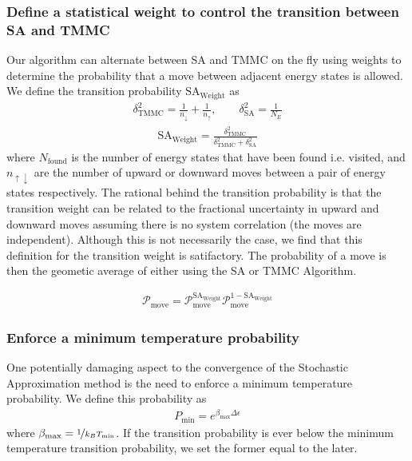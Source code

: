 \documentclass[letterpaper,twocolumn,amsmath,amssymb,pre,aps,10pt]{revtex4-1}
\begin{document}
\subsubsection{Define a statistical weight to control the transition between SA and TMMC}
Our algorithm can alternate between SA and TMMC on the fly using
weights to determine the probability that a move between adjacent
energy states is allowed.  We define the transition probability
$\text{SA}_{\text{Weight}}$ as
\begin{align}
\delta_{\text{TMMC}}^2 =\frac{1}{n_\downarrow}+\frac{1}{n_\uparrow}, \quad\quad
\delta_{\text{SA}}^2 = \frac{1}{N_E}
\end{align}
\begin{align}
\text{SA}_{\text{Weight}} =\frac{\delta_{\text{TMMC}}^2}{\delta_{\text{TMMC}}^2 + \delta_{\text{SA}}^2}
\end{align}
where $N_\text{found}$ is the number of energy states that have been
found i.e. visited, and $n_{\uparrow\downarrow}$ are the number of
upward or downward moves between a pair of energy states respectively.
The rational behind the transition probability is that the transition
weight can be related to the fractional uncertainty in upward and
downward moves assuming there is no system correlation (the moves are
independent).  Although this is not necessarily the case, we find that
this definition for the transition weight is satifactory. The
probability of a move is then the geometic average of either using the
SA or TMMC Algorithm.

\begin{align}
\mathcal{P}_\text{move} = \mathcal{P}_\text{move}^{\text{SA}_\text{Weight}} \mathcal{P}_\text{move}^{1-\text{SA}_\text{Weight}}
\end{align}

\subsubsection{Enforce a minimum temperature probability}
One potentially damaging aspect to the convergence of the Stochastic
Approximation method is the need to enforce a minimum temperature
probability.  We define this probability as
\begin{align}
P_{\text{min}} = e^{\beta_{\text{max}}\Delta\epsilon}
\end{align}
where $\beta_{\text{max}} = \nicefrac{1}{k_B T_\text{min}}$.  If the
transition probability is ever below the minimum temperature transition
probability, we set the former equal to the later.
\end{document}
